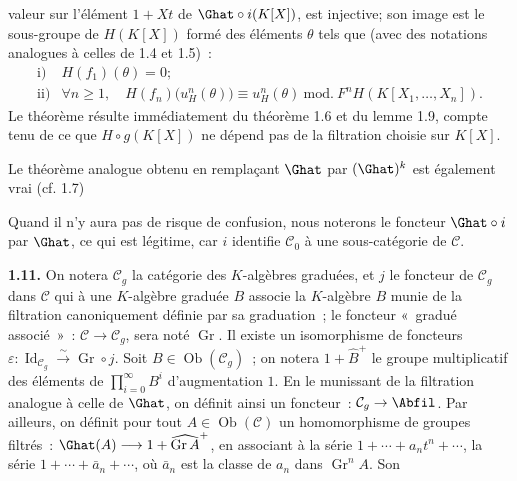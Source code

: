 valeur sur l'élément \(1+Xt\) de \(\Ghat\circ i(K[X])\), est injective; son image est le sous-groupe de \(H(K[X])\) formé des éléments \(\theta\) tels que (avec des notations analogues à celles de 1.4 et 1.5)~:
\[
\begin{array}{ll}
\text{i)}& H(f_1)(\theta)=0;\\[0.3em]
\text{ii)}& \forall n\geq1,\quad
H(f_n)\bigl(u_H^n(\theta)\bigr)\equiv u_H^n(\theta)
\ \mathrm{mod.}\ F^nH(K[X_1,\ldots,X_n]).
\end{array}
\]
Le théorème résulte immédiatement du théorème 1.6 et du lemme 1.9, compte tenu de ce que \(H\circ g(K[X])\) ne dépend pas de la filtration choisie sur \(K[X]\).

Le théorème analogue obtenu en remplaçant \(\Ghat\) par \((\Ghat)^k\) est également vrai (cf. 1.7)

Quand il n'y aura pas de risque de confusion, nous noterons le foncteur \(\Ghat\circ i\) par \(\Ghat\), ce qui est légitime, car \(i\) identifie \(\mathcal C_0\) à une sous-catégorie de \(\mathcal C\).

\textbf{1.11.} On notera \(\mathcal C_g\) la catégorie des \(K\)-algèbres graduées, et \(j\) le foncteur de \(\mathcal C_g\) dans \(\mathcal C\) qui à une \(K\)-algèbre graduée \(B\) associe la \(K\)-algèbre \(B\) munie de la filtration canoniquement définie par sa graduation~; le foncteur «~gradué associé~»~: \(\mathcal C\to\mathcal C_g\), sera noté \(\operatorname{Gr}\). Il existe un isomorphisme de foncteurs \(\varepsilon:\operatorname{Id}_{\mathcal C_g}\xrightarrow{\sim}\operatorname{Gr}\circ j\).
Soit \(B\in\operatorname{Ob}(\mathcal C_g)\)~; on notera \(1+\widehat B^+\) le groupe multiplicatif des éléments de \(\prod\limits_{i=0}^{\infty}B^i\) d'augmentation \(1\). En le munissant de la filtration analogue à celle de \(\Ghat\), on définit ainsi un foncteur~: \(\mathcal C_g\to\Abfil\). Par ailleurs, on définit pour tout \(A\in\operatorname{Ob}(\mathcal C)\) un homomorphisme de groupes filtrés~: \(\Ghat(A)\longrightarrow 1+\widehat{\operatorname{Gr}A}^{+}\), en associant à la série \(1+\cdots+a_nt^n+\cdots\), la série \(1+\cdots+\bar a_n+\cdots\), où \(\bar a_n\) est la classe de \(a_n\) dans \(\operatorname{Gr}^nA\). Son
